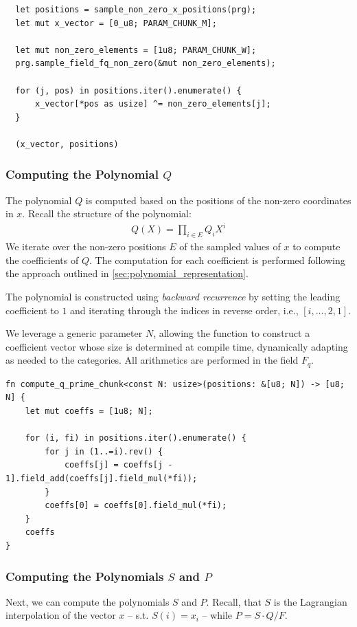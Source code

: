 \documentclass[11pt]{report}
\theoremstyle{definition}
\theoremstyle{plain}
\begin{document}
\begin{verbatim}
  let positions = sample_non_zero_x_positions(prg);
  let mut x_vector = [0_u8; PARAM_CHUNK_M];
  
  let mut non_zero_elements = [1u8; PARAM_CHUNK_W];
  prg.sample_field_fq_non_zero(&mut non_zero_elements);

  for (j, pos) in positions.iter().enumerate() {
      x_vector[*pos as usize] ^= non_zero_elements[j];
  }

  (x_vector, positions)
\end{verbatim}

\subsubsection{Computing the Polynomial $Q$}

The polynomial $Q$ is computed based on the positions of the non-zero coordinates in $x$. Recall the structure of the polynomial:
\begin{align*}
  Q(X) = \prod_{i\in E} Q_i X^i
\end{align*}
We iterate over the non-zero positions $E$ of the sampled values of $x$ to compute the coefficients of $Q$. The computation for each coefficient is performed following the approach outlined in \autoref{sec:polynomial_representation}.

The polynomial is constructed using \textit{backward recurrence} by setting the leading coefficient to $1$ and iterating through the indices in reverse order, i.e., $[i, \dots, 2, 1]$.

We leverage a generic parameter $N$, allowing the function to construct a coefficient vector whose size is determined at compile time, dynamically adapting as needed to the categories. All arithmetics are performed in the field $F_q$.

\begin{verbatim}
fn compute_q_prime_chunk<const N: usize>(positions: &[u8; N]) -> [u8; N] {
    let mut coeffs = [1u8; N];

    for (i, fi) in positions.iter().enumerate() {
        for j in (1..=i).rev() {
            coeffs[j] = coeffs[j - 1].field_add(coeffs[j].field_mul(*fi));
        }
        coeffs[0] = coeffs[0].field_mul(*fi);
    }
    coeffs
}
\end{verbatim}

\subsubsection{Computing the Polynomials $S$ and $P$}
Next, we can compute the polynomials $S$ and $P$. Recall, that $S$ is the Lagrangian interpolation of the vector $x$ -- s.t. $S(i) = x_i$ -- while $P = S \cdot Q / F$.
\end{document}

